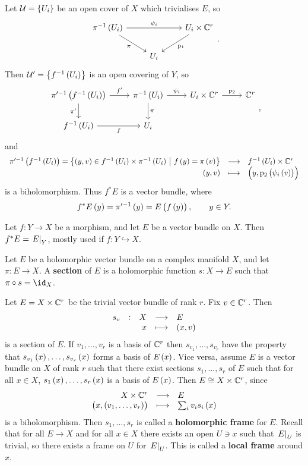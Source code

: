 Let $ \UUU = \cbr{U_i} $ be an open cover of $ X $ which trivialises $ E $, so
$$
\begin{tikzcd}
\pi^{-1}\br{U_i} \arrow{rr}{\psi_i} \arrow[swap]{dr}{\pi} & & U_i \times \CC^r \arrow{dl}{\p_1} \\
& U_i &
\end{tikzcd}.
$$
Then $ \UUU' = \cbr{f^{-1}\br{U_i}} $ is an open covering of $ Y $, so
$$
\begin{tikzcd}
\pi'^{-1}\br{f^{-1}\br{U_i}} \arrow{r}{f'} \arrow[swap]{d}{\pi'} & \pi^{-1}\br{U_i} \arrow{r}{\psi_i} \arrow{d}{\pi} & U_i \times \CC^r \arrow{r}{\p_2} & \CC^r \\
f^{-1}\br{U_i} \arrow[swap]{r}{f} & U_i & &
\end{tikzcd},
$$
and
$$ \function{\pi'^{-1}\br{f^{-1}\br{U_i}} = \cbr{\br{y, v} \in f^{-1}\br{U_i} \times \pi^{-1}\br{U_i} \st f\br{y} = \pi\br{v}}}{f^{-1}\br{U_i} \times \CC^r}{\br{y, v}}{\br{y, \p_2\br{\psi_i\br{v}}}} $$
is a biholomorphism. Thus $ f^*E $ is a vector bundle, where
$$ f^*E\br{y} = \pi'^{-1}\br{y} = E\br{f\br{y}}, \qquad y \in Y. $$

\begin{notation}
Let $ f : Y \to X $ be a morphism, and let $ E $ be a vector bundle on $ X $. Then $ f^*E = \left. E \right|_Y $, mostly used if $ f : Y \hookrightarrow X $.
\end{notation}

\begin{definition}
Let $ E $ be a holomorphic vector bundle on a complex manifold $ X $, and let $ \pi : E \to X $. A \textbf{section} of $ E $ is a holomorphic function $ s : X \to E $ such that $ \pi \circ s = \id_X $.
\end{definition}

\begin{example}
Let $ E = X \times \mathbb{C}^r $ be the trivial vector bundle of rank $ r $. Fix $ v \in \mathbb{C}^r $. Then
$$ \function[s_v]{X}{E}{x}{\br{x, v}} $$
is a section of $ E $. If $ v_1, \dots, v_r $ is a basis of $ \mathbb{C}^r $ then $ s_{v_1}, \dots, s_{v_r} $ have the property that $ s_{v_1}\br{x}, \dots, s_{v_r}\br{x} $ forms a basis of $ E\br{x} $. Vice versa, assume $ E $ is a vector bundle on $ X $ of rank $ r $ such that there exist sections $ s_1, \dots, s_r $ of $ E $ such that for all $ x \in X $, $ s_1\br{x}, \dots, s_r\br{x} $ is a basis of $ E\br{x} $. Then $ E \cong X \times \mathbb{C}^r $, since
$$ \function{X \times \CC^r}{E}{\br{x, \br{v_1, \dots, v_r}}}{\sum_i v_is_i\br{x}} $$
is a biholomorphism. Then $ s_1, \dots, s_r $ is called a \textbf{holomorphic frame} for $ E $. Recall that for all $ E \to X $ and for all $ x \in X $ there exists an open $ U \ni x $ such that $ \left. E \right|_U $ is trivial, so there exists a frame on $ U $ for $ \left. E \right|_U $. This is called a \textbf{local frame} around $ x $.
\end{example}

